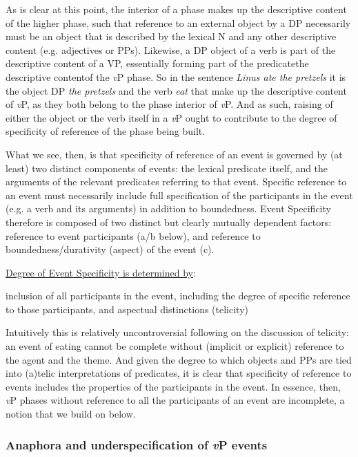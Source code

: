 \documentclass[output=paper
,modfonts
,nonflat
]{langsci/langscibook}
\begin{document}
As is clear at this point, the interior of a phase makes up the descriptive content of the higher phase, such that reference to an external object by a DP necessarily must be an object that is described by the lexical N and any other descriptive content (e.g. adjectives or PPs). Likewise, a DP object of a verb is part of the descriptive content of a VP, essentially forming part of the predicate\textemdash the descriptive content\textemdash of the \textit{v}P phase. So in the sentence \textit{Linus ate the pretzels} it is the object DP \textit{the pretzels} and the verb \textit{eat} that make up the descriptive content of \textit{v}P, as they both belong to the phase interior of \textit{v}P. And as such, raising of either the object or the verb itself in a \textit{v}P ought to contribute to the degree of specificity of reference of the phase being built.

What we see, then, is that specificity of reference of an event is governed by (at least) two distinct components of events: the lexical predicate itself, and the arguments of the relevant predicates referring to that event. Specific reference to an event must necessarily include full specification of the participants in the event (e.g. a verb and its arguments) in addition to boundedness. Event Specificity therefore is composed of two distinct but clearly mutually dependent factors: reference to event participants (a/b below), and reference to boundedness/durativity (aspect) of the event (c). 

\ea \underline{Degree of Event Specificity is determined by}:

\begin{xlist}
\ex inclusion of all participants in the event, including \label{IncludeParticipants}
\ex the degree of specific reference to those participants, and %
\ex aspectual distinctions (telicity)
\end{xlist}

\z
\noindent Intuitively this is relatively uncontroversial following on the discussion of telicity: an event of eating cannot be complete without (implicit or explicit) reference to the agent and the theme. And given the degree to which objects and PPs are tied into (a)telic interpretations of predicates, it is clear that specificity of reference to events includes the properties of the participants in the event. In essence, then, \textit{v}P phases without reference to all the participants of an event are incomplete, a notion that we build on below.

\subsubsection{Anaphora and underspecification of \textit{v}P events}
\end{document}
